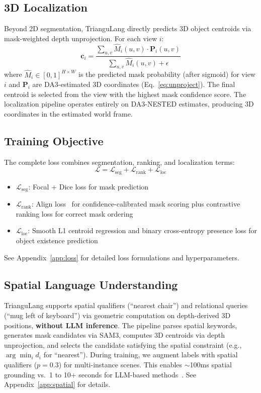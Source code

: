 \subsection{3D Localization}
\label{sec:centroid}

Beyond 2D segmentation, TrianguLang directly predicts 3D object centroids via mask-weighted depth unprojection. For each view $i$:
\begin{equation}
\mathbf{c}_i = \frac{\sum_{u,v} \hat{M}_i(u,v) \cdot \mathbf{P}_i(u,v)}{\sum_{u,v} \hat{M}_i(u,v) + \epsilon}
\label{eq:centroid}
\end{equation}
where $\hat{M}_i \in [0,1]^{H \times W}$ is the predicted mask probability (after sigmoid) for view $i$ and $\mathbf{P}_i$ are DA3-estimated 3D coordinates (Eq.~\cref{eq:unproject}). The final centroid is selected from the view with the highest mask confidence score. The localization pipeline operates entirely on DA3-NESTED estimates, producing 3D coordinates in the estimated world frame.

\subsection{Training Objective}

The complete loss combines segmentation, ranking, and localization terms:
\begin{equation}
\mathcal{L} = \mathcal{L}_{\text{seg}} + \mathcal{L}_{\text{rank}} + \mathcal{L}_{\text{loc}}
\label{eq:total_loss}
\end{equation}

\begin{itemize}[nosep,leftmargin=*]
    \item $\mathcal{L}_{\text{seg}}$: Focal + Dice loss for mask prediction
    \item $\mathcal{L}_{\text{rank}}$: Align loss~\cite{align2024} for confidence-calibrated mask scoring plus contrastive ranking loss for correct mask ordering
    \item $\mathcal{L}_{\text{loc}}$: Smooth L1 centroid regression and binary cross-entropy presence loss for object existence prediction
\end{itemize}

See Appendix~\cref{app:loss} for detailed loss formulations and hyperparameters.

\subsection{Spatial Language Understanding}
\label{sec:spatial}

TrianguLang supports spatial qualifiers (``nearest chair'') and relational queries (``mug left of keyboard'') via geometric computation on depth-derived 3D positions, \textbf{without LLM inference}. The pipeline parses spatial keywords, generates mask candidates via SAM3, computes 3D centroids via depth unprojection, and selects the candidate satisfying the spatial constraint (e.g., $\arg\min_i d_i$ for ``nearest''). During training, we augment labels with spatial qualifiers ($p{=}0.3$) for multi-instance scenes. This enables $\sim$100ms spatial grounding vs.\ 1 to 10+ seconds for LLM-based methods~\cite{spatialvlm,3dllm,leo}. See Appendix~\cref{app:spatial} for details.
